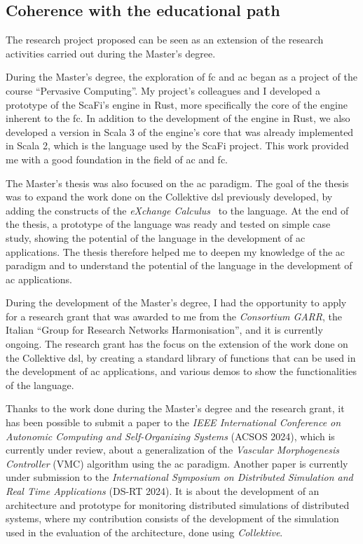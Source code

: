 \documentclass[12pt, a4paper]{article}
\newcommand{\note}[3]{\todo[inline,linecolor=#1,backgroundcolor=#1!25,bordercolor=#1]{\textbf{#2:} #3}}
\newcommand{\angela}[1]{\note{blue}{Angela}{#1}}
\begin{document}
\subsection{Coherence with the educational path}\label{subsec:coherence-with-the-educational-path}

The research project proposed can be seen as an extension of the research activities carried out during the Master's degree.

During the Master's degree, the exploration of \ac{fc} and \ac{ac} began as a project of the course ``Pervasive Computing''.
%
My project's colleagues and I developed a prototype of the ScaFi's engine in Rust,
more specifically the core of the engine inherent to the \ac{fc}.
%
In addition to the development of the engine in Rust,
we also developed a version in Scala 3 of the engine's core that was already implemented in Scala 2,
which is the language used by the ScaFi project.
%
This work provided me with a good foundation in the field of \ac{ac} and \ac{fc}.

The Master's thesis was also focused on the \ac{ac} paradigm.
%
The goal of the thesis was to expand the work done on the Collektive \ac{dsl} previously developed,
by adding the constructs of the \emph{eXchange Calculus}~\cite{AudritoCDSV24} to the language. \angela{todo explain xc and collektive?}
%
At the end of the thesis, a prototype of the language was ready and tested on simple case study,
showing the potential of the language in the development of \ac{ac} applications.
%
The thesis therefore helped me to deepen my knowledge of the \ac{ac} paradigm and to understand the potential
of the language in the development of \ac{ac} applications.

During the development of the Master's degree,
I had the opportunity to apply for a research grant that was awarded to me from the \emph{Consortium GARR},
the Italian ``Group for Research Networks Harmonisation'',
and it is currently ongoing.
%
The research grant has the focus on the extension of the work done on the Collektive \ac{dsl},
by creating a standard library of functions that can be used in the development of \ac{ac} applications,
and various demos to show the functionalities of the language.

Thanks to the work done during the Master's degree and the research grant,
it has been possible to submit a paper to the \emph{IEEE International Conference on Autonomic Computing and Self-Organizing Systems} (ACSOS 2024),
which is currently under review,
about a generalization of the \emph{Vascular Morphogenesis Controller} (VMC) algorithm using the \ac{ac} paradigm.
%
Another paper is currently under submission to the \emph{International Symposium on Distributed Simulation and Real Time Applications} (DS-RT 2024).
%
It is about the development of an architecture and prototype for monitoring distributed simulations of distributed systems,
where my contribution consists of the development of the simulation used in the evaluation of the architecture,
done using \emph{Collektive}.
\end{document}
